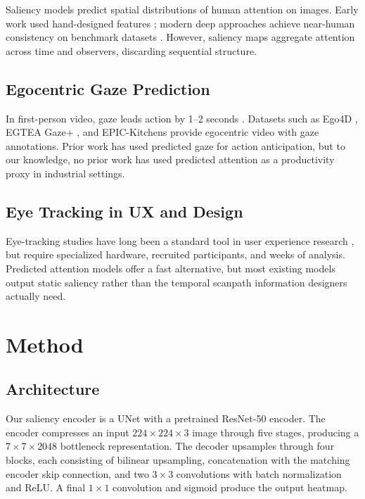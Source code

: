 \documentclass{article}
\begin{document}
Saliency models predict spatial distributions of human attention on images. Early work used hand-designed features \citep{itti1998model}; modern deep approaches \citep{pan2016shallow, kummerer2017understanding, kruthiventi2017deepfix} achieve near-human consistency on benchmark datasets \citep{bylinskii2019different}. However, saliency maps aggregate attention across time and observers, discarding sequential structure.

\subsection{Egocentric Gaze Prediction}

In first-person video, gaze leads action by 1--2 seconds \citep{hayhoe2005eye, li2021eye}. Datasets such as Ego4D \citep{grauman2022ego4d}, EGTEA Gaze+ \citep{li2018eye}, and EPIC-Kitchens \citep{damen2018scaling} provide egocentric video with gaze annotations. Prior work has used predicted gaze for action anticipation, but to our knowledge, no prior work has used predicted attention as a productivity proxy in industrial settings.

\subsection{Eye Tracking in UX and Design}

Eye-tracking studies have long been a standard tool in user experience research \citep{rayner1998eye, buswell1935people}, but require specialized hardware, recruited participants, and weeks of analysis. Predicted attention models offer a fast alternative, but most existing models output static saliency rather than the temporal scanpath information designers actually need.

\section{Method}

\subsection{Architecture}

Our saliency encoder is a UNet \citep{ronneberger2015u} with a pretrained ResNet-50 \citep{he2016deep} encoder. The encoder compresses an input $224 \times 224 \times 3$ image through five stages, producing a $7 \times 7 \times 2048$ bottleneck representation. The decoder upsamples through four blocks, each consisting of bilinear upsampling, concatenation with the matching encoder skip connection, and two $3 \times 3$ convolutions with batch normalization and ReLU. A final $1 \times 1$ convolution and sigmoid produce the output heatmap.
\end{document}
